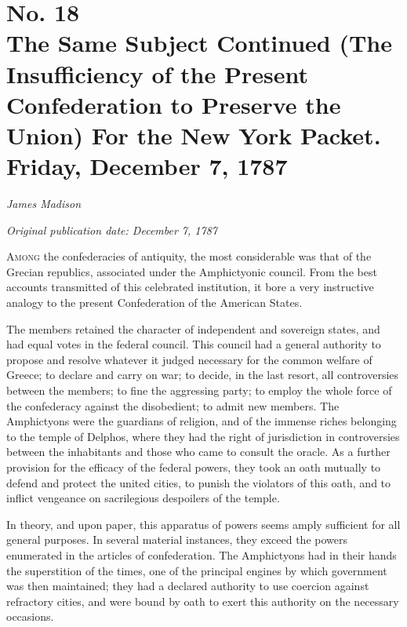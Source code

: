 \chapter[No. 18: The Same Subject Continued (The Insufficiency of the Present Confederation to Preserve the Union) For the New York Packet. Friday, December 7, 1787]{No. 18\\ {\small The Same Subject Continued (The Insufficiency of the Present Confederation to Preserve the Union) For the New York Packet. Friday, December 7, 1787}}

\textit{James Madison}

\textit{Original publication date: December 7, 1787}
\vspace{1cm}

\textsc{Among} the confederacies of antiquity, the most considerable was that of the Grecian republics, associated under the Amphictyonic council. From the best accounts transmitted of this celebrated institution, it bore a very instructive analogy to the present Confederation of the American States.
\vspace{.4cm}

The members retained the character of independent and sovereign states, and had equal votes in the federal council. 
This council had a general authority to propose and resolve whatever it judged necessary for the common welfare of Greece; to declare and carry on war; to decide, in the last resort, all controversies between the members; to fine the aggressing party; to employ the whole force of the confederacy against the disobedient; to admit new members. 
The Amphictyons were the guardians of religion, and of the immense riches belonging to the temple of Delphos, where they had the right of jurisdiction in controversies between the inhabitants and those who came to consult the oracle. 
As a further provision for the efficacy of the federal powers, they took an oath mutually to defend and protect the united cities, to punish the violators of this oath, and to inflict vengeance on sacrilegious despoilers of the temple.

In theory, and upon paper, this apparatus of powers seems amply sufficient for all general purposes. 
In several material instances, they exceed the powers enumerated in the articles of confederation. 
The Amphictyons had in their hands the superstition of the times, one of the principal engines by which government was then maintained; they had a declared authority to use coercion against refractory cities, and were bound by oath to exert this authority on the necessary occasions.

